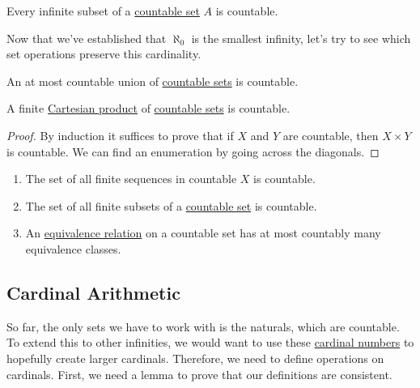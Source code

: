   \begin{theorem}
    \label{thm:infinite-subsets-of-countable-sets-are-countable}
    Every infinite subset of a \hyperref[def:countable]{countable set} $A$ is countable. 
  \end{theorem} 

  Now that we've established that $\aleph_0$ is the smallest infinity, let's try to see which set operations preserve this cardinality. 

  \begin{theorem}
    \label{thm:countable-union-is-countable}
    An at most countable union of \hyperref[def:countable]{countable sets} is countable. 
  \end{theorem}

  \begin{theorem}
    \label{thm:finite-product-is-countable}
    A finite \hyperref[def:cartesian-product]{Cartesian product} of \hyperref[def:countable]{countable sets} is countable. 
  \end{theorem}
  \begin{proof}
    By induction it suffices to prove that if $X$ and $Y$ are countable, then $X \times Y$ is countable. We can find an enumeration by going across the diagonals. 
  \end{proof} 

  \begin{theorem}
    \label{thm:further-properties}
 
    \begin{enumerate}
      \item The set of all finite sequences in countable $X$ is countable. 
      \item The set of all finite subsets of a \hyperref[def:countable]{countable set} is countable. 
      \item An \hyperref[def:equivalence_relation]{equivalence relation} on a countable set has at most countably many equivalence classes. 
    \end{enumerate}
  \end{theorem} 

\subsection{Cardinal Arithmetic} 

  So far, the only sets we have to work with is the naturals, which are countable. To extend this to other infinities, we would want to use these \hyperref[def:cardinal-numbers]{cardinal numbers} to hopefully create larger cardinals. Therefore, we need to define operations on cardinals. First, we need a lemma to prove that our definitions are consistent. 

